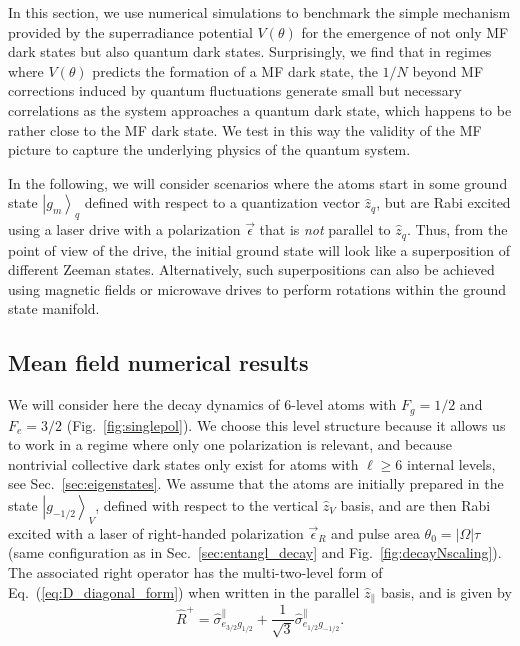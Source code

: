 \documentclass[aps,prx,superscriptaddress,twocolumn,notitlepage,nofootinbib,longbibliography]{revtex4-2}
\newcommand{\ket}[1]{\left|#1\right>}
\newcommand{\quv}{\hat{z}}
\newcommand{\qusub}{q}
\begin{document}
In this section, we use  numerical simulations to benchmark the simple mechanism provided by the superradiance potential $V(\theta)$ for the emergence of  not only MF dark states  but also quantum dark states.
Surprisingly, we find that in regimes where $V(\theta)$ predicts the formation of a MF dark state, the $1/N$ beyond MF corrections induced by quantum fluctuations generate small but necessary correlations as the system approaches a quantum dark state, which happens to be rather close to the MF dark state.
We test in this way the validity of the MF picture to capture the underlying physics of the quantum system.

In the following, we will consider scenarios where the atoms start in some ground state $\ket{g_m}_{\qusub}$ defined with respect to a quantization vector $\quv_q$, but are Rabi excited using a laser drive with a polarization $\vec{\epsilon}$ that is \emph{not} parallel to $\quv_q$.
Thus, from the point of view of the drive, the initial ground state will look like a superposition of different Zeeman states.
Alternatively, such superpositions can also be achieved using magnetic fields or microwave drives to perform rotations within the ground state manifold.




\subsection{Mean field numerical results}

We will consider here the decay dynamics of 6-level atoms with $F_g=1/2$ and $F_e=3/2$ (Fig.~\ref{fig:singlepol}).
We choose this level structure because it allows us to work in a regime where only one polarization is relevant, and because nontrivial collective dark states only exist for atoms with $\ell\geq6$ internal levels, see Sec.~\ref{sec:eigenstates}.
We assume that the atoms are initially prepared in the state $\ket{g_{-1/2}}_V$, defined with respect to the vertical $\quv_V$ basis, and are then Rabi excited with a laser of right-handed polarization $\vec{\epsilon}_R$ and pulse area $\theta_0=|\Omega|\tau$ (same configuration as in Sec.~\ref{sec:entangl_decay} and Fig.~\ref{fig:decayNscaling}).
The associated right operator has the multi-two-level form of Eq.~(\ref{eq:D_diagonal_form}) when written in the parallel $\quv_\parallel$ basis, and is given by
\begin{equation}
	\hat{R}^+ = \hat{\sigma}^\parallel_{e_{3/2}g_{1/2}} + \frac{1}{\sqrt{3}} \hat{\sigma}^\parallel_{e_{1/2}g_{-1/2}}.
\label{eq:Rplus_6level_parallel}
\end{equation}
\end{document}
